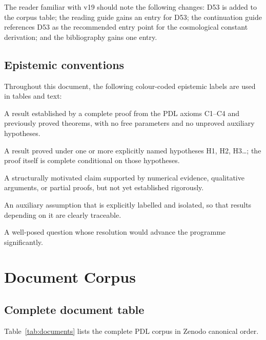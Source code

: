 \documentclass[11pt,a4paper]{article}
\theoremstyle{plain}
\theoremstyle{definition}
\theoremstyle{remark}
\begin{document}
The reader familiar with v19 should note the following changes: D53 is added to the corpus table; the reading guide gains an entry for D53; the continuation guide references D53 as the recommended entry point for the cosmological constant derivation; and the bibliography gains one entry.

\subsection{Epistemic conventions}
\label{subsec:conventions}
Throughout this document, the following colour-coded epistemic labels are used in tables and text:
\begin{description}[leftmargin=2.5cm, style=nextline]
\item[\textcolor{proofblue}{Theorem}] A result established by a complete proof from the PDL axioms C1--C4 and previously proved theorems, with no free parameters and no unproved auxiliary hypotheses.
\item[\textcolor{proofblue}{Theorem (H$x$)}] A result proved under one or more explicitly named hypotheses H1, H2, H3\ldots; the proof itself is complete conditional on those hypotheses.
\item[\textcolor{conjecturegreen}{Conjecture}] A structurally motivated claim supported by numerical evidence, qualitative arguments, or partial proofs, but not yet established rigorously.
\item[\textcolor{hypothesisorange}{Named Hypothesis}] An auxiliary assumption that is explicitly labelled and isolated, so that results depending on it are clearly traceable.
\item[\textcolor{openproblemred}{Open Problem}] A well-posed question whose resolution would advance the programme significantly.
\end{description}

\section{Document Corpus}
\label{sec:corpus}

\subsection{Complete document table}
\label{subsec:doctable}
Table~\ref{tab:documents} lists the complete PDL corpus in Zenodo canonical order.
\end{document}
